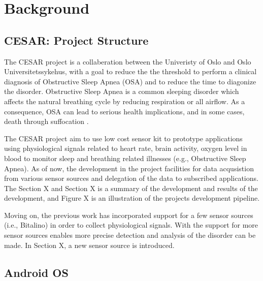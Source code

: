 \chapter{Background}

\section{CESAR: Project Structure}
The CESAR project is a collaberation between the Univeristy of Oslo and Oslo Universitetssykehus, with a goal to reduce the the threshold to perform a clinical diagnosis of Obstructive Sleep Apnea (OSA) and to reduce the time to diagonize the disorder. Obstructive Sleep Apnea is a common sleeping disorder which affects the natural breathing cycle by reducing respiration or all airflow. As a consequence, OSA can lead to serious health implications, and in some cases, death through suffocation \cite{cesarinfo}. 

The CESAR project aim to use low cost sensor kit to prototype applications using physiological signals related to heart rate, brain activity, oxygen level in blood to monitor sleep and breathing related illnesses (e.g., Obstructive Sleep Apnea). As of now, the development in the project facilities for data acqusistion from various sensor sources and delegation of the data to subscribed applications. The Section X and Section X is a summary of the development and results of the development, and Figure X is an illustration of the projects development pipeline. 

Moving on, the previous work has incorporated support for a few sensor sources (i.e., Bitalino) in order to collect physiological signals. With the support for more sensor sources enables more precise detection and analysis of the disorder can be made. In Section X, a new sensor source is introduced. 



\section{Android OS}

